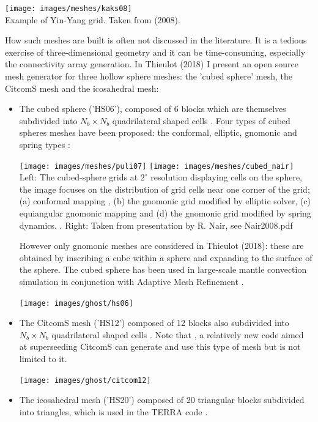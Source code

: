 \begin{center}
\texttt{[image: images/meshes/kaks08]}\\
{\captionfont Example of Yin-Yang grid. Taken from \textcite{kaks08} (2008).}
\end{center}

How such meshes are built is often not discussed in the literature. It is 
a tedious exercise of three-dimensional geometry and it can be time-consuming, especially 
the connectivity array generation. In Thieulot (2018) \cite{thie18} I present an open source 
mesh generator for three hollow sphere meshes: the 'cubed sphere' mesh, the CitcomS mesh and the 
icosahedral mesh:

\begin{itemize}
\item 
The cubed sphere ('HS06'), composed of 6 blocks which 
are themselves subdivided into $N_b \times N_b$ quadrilateral shaped cells  \cite{sado72,roip96,heta03,busa13}.
Four types of cubed spheres meshes have been proposed: the conformal, elliptic, gnomonic and spring types \cite{puli07}:


\begin{center}
\texttt{[image: images/meshes/puli07]}
\texttt{[image: images/meshes/cubed\_nair]}\\
{\captionfont 
Left: The cubed-sphere grids at $2^\circ$ resolution displaying cells on the sphere,
 the image focuses on the distribution of grid cells near one corner of the grid;
 (a) conformal mapping \cite{rapm96,mcgr96}, (b) the gnomonic grid modified by elliptic solver,
 (c) equiangular gnomonic mapping and (d) the gnomonic grid modified by spring dynamics. \cite{puli07}.
Right: Taken from presentation by R. Nair, see Nair2008.pdf
}
\end{center}

However only gnomonic meshes are considered in Thieulot (2018): these 
are obtained by inscribing a cube within a sphere and expanding to the surface
of the sphere.
The cubed sphere has been used in large-scale mantle convection simulation in conjunction with 
Adaptive Mesh Refinement \cite{algs12,busa13}.  

\begin{center}
\texttt{[image: images/ghost/hs06]}
\end{center}



\item 
The CitcomS mesh ('HS12') composed of 12 blocks also subdivided 
into $N_b \times N_b$ quadrilateral shaped cells
\cite{zhzm00,sthh06,zhmt08,arfw14}.
Note that \aspect{} \cite{krhb12,hedg17}, a relatively new code aimed at 
superseeding CitcomS can generate and use 
this type of mesh \cite{thie17} but is not limited to it.

\begin{center}
\texttt{[image: images/ghost/citcom12]}
\end{center}


\item The icosahedral mesh ('HS20') composed of 20 triangular blocks \cite{bafr85,baum85} subdivided into triangles, which is 
used in the TERRA code \cite{burb96,burb97,burl98,dadb13}.
\end{itemize}


